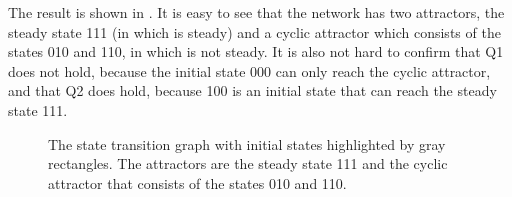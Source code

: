\documentclass[letterpaper,10pt,english]{sphinxmanual}
\begin{document}
\begin{sphinxVerbatim}[commandchars=\\\{\}]
   
   
     \PYG{p}{[}\PYG{p}{]}
        \PYG{p}{[}\PYG{p}{]}\PYG{p}{[}\PYG{p}{]}  
        \PYG{p}{[}\PYG{p}{]}\PYG{p}{[}\PYG{p}{]}  
\PYG{p}{[}\PYG{p}{]}  
\end{sphinxVerbatim}

The result is shown in {\hyperref[\detokenize{Manual:figure22}]{}}.
It is easy to see that the network has two attractors, the steady state 111 (in which  is steady) and a cyclic attractor which consists of the states 010 and 110, in which  is not steady.
It is also not hard to confirm that Q1 does not hold,
because the initial state 000 can only reach the cyclic attractor,
and that Q2 does hold, because 100 is an initial state that can reach the steady state 111.

\begin{figure}[htbp]
\centering
\capstart

\noindent{}
\caption{The state transition graph  with initial states highlighted by gray rectangles.
The attractors are the steady state 111 and the cyclic attractor that consists of the states 010 and 110.}\label{\detokenize{Manual:figure22}}\label{\detokenize{Manual:id26}}\end{figure}
\end{document}
